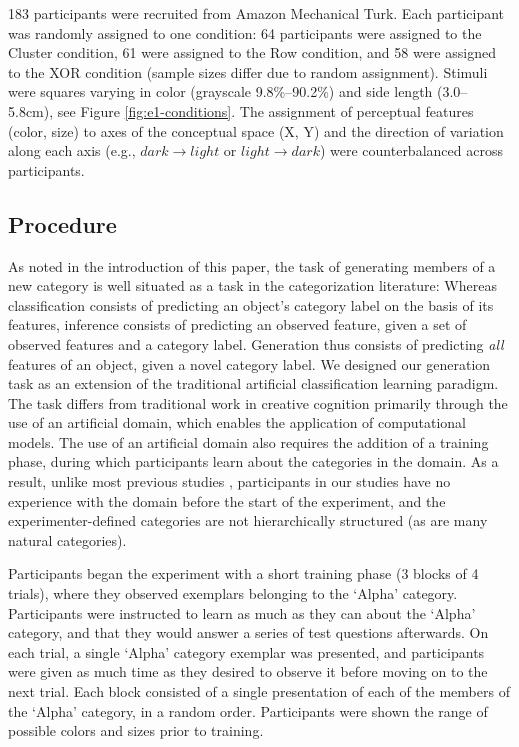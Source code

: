 \documentclass[pdflatex,sn-apa]{sn-jnl}%
\theoremstyle{thmstyleone}%
\theoremstyle{thmstyletwo}%
\theoremstyle{thmstylethree}%
\begin{document}
183 participants were recruited from Amazon Mechanical Turk. Each participant
was randomly assigned to one condition: 64 participants were assigned to the
Cluster condition, 61 were assigned to the Row condition, and 58 were assigned
to the XOR condition (sample sizes differ due to random assignment). Stimuli
were squares varying in color (grayscale 9.8\%--90.2\%) and side length
(3.0--5.8cm), see Figure \ref{fig:e1-conditions}. The assignment of perceptual
features (color, size) to axes of the conceptual space (X, Y)  and the
direction of variation along each axis (e.g., $dark \rightarrow light$ or $light
\rightarrow dark$) were counterbalanced across participants.

\subsection{Procedure}

As noted in the introduction of this paper, the task of generating members of a
new category is well situated as a task in the categorization
literature: Whereas classification consists of predicting an object's category
label on the basis of its features, inference consists of predicting an observed
feature, given a set of observed features and a category label. Generation thus
consists of predicting {\em all} features of an object, given a novel category
label. We designed our generation task as an
extension of the traditional artificial classification learning paradigm. The
task differs from traditional work in creative cognition primarily through the
use of an artificial domain, which enables the application of computational
models. The use of an artificial domain also requires the addition of a training
phase, during which participants learn about the categories in the domain. As a
result, unlike most previous studies \citep[e.g.,][]{ward1994structured},
participants in our studies have no experience with the domain before the start
of the experiment, and the experimenter-defined categories are not
hierarchically structured (as are many natural categories).

Participants began the experiment with a short training phase (3 blocks of 4
trials), where they observed exemplars belonging to the `Alpha' category.
Participants were instructed to learn as much as they can about the `Alpha'
category, and that they would answer a series of test questions afterwards. On
each trial, a single `Alpha' category exemplar was presented, and participants
were given as much time as they desired to observe it before moving on to the
next trial. Each block consisted of a single presentation of each of the members
of the `Alpha' category, in a random order. Participants were shown the range of
possible colors and sizes prior to training.
\end{document}
